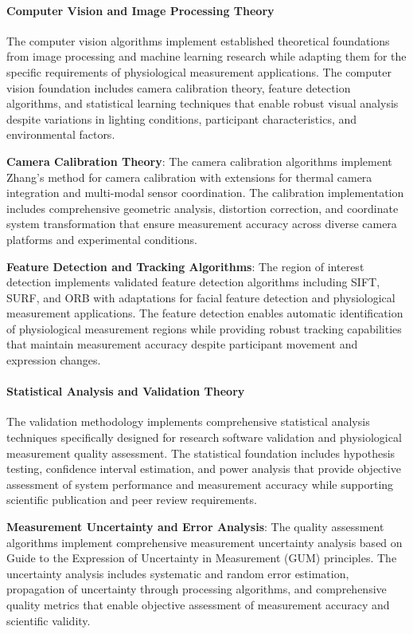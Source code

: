 \documentclass[12pt,a4paper]{report}
\begin{document}
\paragraph{Computer Vision and Image Processing Theory}

The computer vision algorithms implement established theoretical foundations from image processing and machine learning
research while adapting them for the specific requirements of physiological measurement applications. The computer
vision foundation includes camera calibration theory, feature detection algorithms, and statistical learning techniques
that enable robust visual analysis despite variations in lighting conditions, participant characteristics, and
environmental factors.

\textbf{Camera Calibration Theory}: The camera calibration algorithms implement Zhang's method for camera calibration \cite{zhang2000flexible} with
extensions for thermal camera integration and multi-modal sensor coordination. The calibration implementation includes
comprehensive geometric analysis, distortion correction, and coordinate system transformation that ensure measurement
accuracy across diverse camera platforms and experimental conditions.

\textbf{Feature Detection and Tracking Algorithms}: The region of interest detection implements validated feature detection
algorithms including SIFT, SURF, and ORB with adaptations for facial feature detection and physiological measurement
applications. The feature detection enables automatic identification of physiological measurement regions while
providing robust tracking capabilities that maintain measurement accuracy despite participant movement and expression
changes.

\paragraph{Statistical Analysis and Validation Theory}

The validation methodology implements comprehensive statistical analysis techniques specifically designed for research
software validation and physiological measurement quality assessment. The statistical foundation includes hypothesis
testing, confidence interval estimation, and power analysis that provide objective assessment of system performance and
measurement accuracy while supporting scientific publication and peer review requirements.

\textbf{Measurement Uncertainty and Error Analysis}: The quality assessment algorithms implement comprehensive measurement
uncertainty analysis based on Guide to the Expression of Uncertainty in Measurement (GUM) principles. The uncertainty
analysis includes systematic and random error estimation, propagation of uncertainty through processing algorithms, and
comprehensive quality metrics that enable objective assessment of measurement accuracy and scientific validity.
\end{document}
